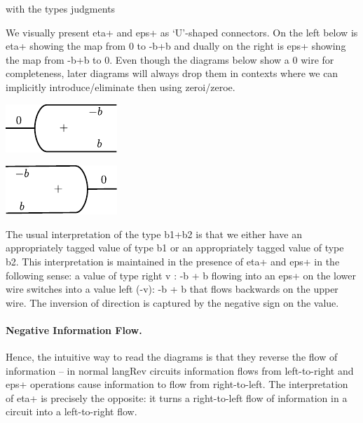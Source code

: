 \documentclass[preprint]{sigplanconf}
\begin{document}
\noindent
with the types judgments



We visually present {{eta+}} and {{eps+}} as `U'-shaped connectors. On
the left below is {{eta+}} showing the map from {{0}} to {{-b+b}} and
dually on the right is {{eps+}} showing the map from {{-b+b}} to
0. Even though the diagrams below show a {{0}} wire for completeness,
later diagrams will always drop them in contexts where we can
implicitly introduce/eliminate then using {{zeroi}}/{{zeroe}}.

\begin{multicols}{2}
\begin{center}
  \includegraphics{diagrams/eta.pdf}
\end{center}
  
\begin{center}
  \includegraphics{diagrams/eps.pdf}
\end{center}
\end{multicols}

The usual interpretation of the type {{b1+b2}} is that we either have
an appropriately tagged value of type {{b1}} or an appropriately
tagged value of type {{b2}}. This interpretation is maintained in the
presence of {{eta+}} and {{eps+}} in the following sense: a value of
type {{right v : -b + b}} flowing into an {{eps+}} on the lower wire
switches into a value {{left (-v): -b + b}} that flows backwards on the
upper wire. The inversion of direction is captured by the negative
sign on the value.

\paragraph*{Negative Information Flow.} 
Hence, the intuitive way to read the diagrams is that they reverse the
flow of information -- in normal {{langRev}} circuits information
flows from left-to-right and {{eps+}} operations cause information to
flow from right-to-left.  The interpretation of {{eta+}} is precisely
the opposite: it turns a right-to-left flow of information in a
circuit into a left-to-right flow.
\end{document}
